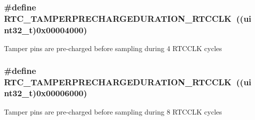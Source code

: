 \subsubsection[{\texorpdfstring{R\+T\+C\+\_\+\+T\+A\+M\+P\+E\+R\+P\+R\+E\+C\+H\+A\+R\+G\+E\+D\+U\+R\+A\+T\+I\+O\+N\+\_\+4\+R\+T\+C\+C\+LK}{RTC_TAMPERPRECHARGEDURATION_4RTCCLK}}]{\setlength{\rightskip}{0pt plus 5cm}\#define R\+T\+C\+\_\+\+T\+A\+M\+P\+E\+R\+P\+R\+E\+C\+H\+A\+R\+G\+E\+D\+U\+R\+A\+T\+I\+O\+N\+\_\+R\+T\+C\+C\+LK~((uint32\+\_\+t)0x00004000)}\hypertarget{group___r_t_c_ex___tamper___pin___precharge___duration___definitions_ga12497acabf044c2d1de7d735efdb2efc}{}\label{group___r_t_c_ex___tamper___pin___precharge___duration___definitions_ga12497acabf044c2d1de7d735efdb2efc}
Tamper pins are pre-\/charged before sampling during 4 R\+T\+C\+C\+LK cycles 
\subsubsection[{\texorpdfstring{R\+T\+C\+\_\+\+T\+A\+M\+P\+E\+R\+P\+R\+E\+C\+H\+A\+R\+G\+E\+D\+U\+R\+A\+T\+I\+O\+N\+\_\+8\+R\+T\+C\+C\+LK}{RTC_TAMPERPRECHARGEDURATION_8RTCCLK}}]{\setlength{\rightskip}{0pt plus 5cm}\#define R\+T\+C\+\_\+\+T\+A\+M\+P\+E\+R\+P\+R\+E\+C\+H\+A\+R\+G\+E\+D\+U\+R\+A\+T\+I\+O\+N\+\_\+R\+T\+C\+C\+LK~((uint32\+\_\+t)0x00006000)}\hypertarget{group___r_t_c_ex___tamper___pin___precharge___duration___definitions_ga353fca64c5b0e927ab024ed13a526e09}{}\label{group___r_t_c_ex___tamper___pin___precharge___duration___definitions_ga353fca64c5b0e927ab024ed13a526e09}
Tamper pins are pre-\/charged before sampling during 8 R\+T\+C\+C\+LK cycles 